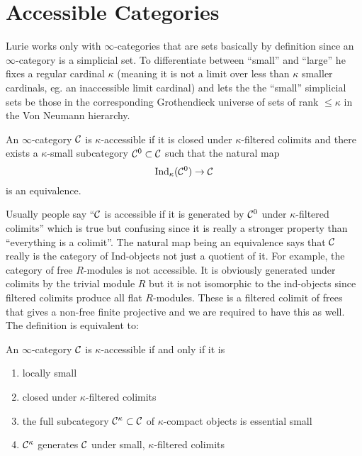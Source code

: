 \documentclass[12pt]{article}
\begin{document}
\section{Accessible Categories}

Lurie works only with $\infty$-categories that are sets basically by definition since an $\infty$-category is a simplicial set. To differentiate between ``small'' and ``large'' he fixes a regular cardinal $\kappa$ (meaning it is not a limit over less than $\kappa$ smaller cardinals, eg. an inaccessible limit cardinal) and lets the the ``small'' simplicial sets be those in the corresponding Grothendieck universe of sets of rank $\le \kappa$ in the Von Neumann hierarchy.

\begin{defn}
An $\infty$-category $\mathcal{C}$ is $\kappa$-accessible if it is closed under $\kappa$-filtered colimits and there exists a $\kappa$-small subcategory $\mathcal{C}^0 \subset \mathcal{C}$ such that the natural map
\[ \mathrm{Ind}_{\kappa}(\mathcal{C}^0) \to \mathcal{C} \]
is an equivalence.
\end{defn}

Usually people say ``$\mathcal{C}$ is accessible if it is generated by $\mathcal{C}^0$ under $\kappa$-filtered colimits'' which is true but confusing since it is really a stronger property than ``everything is a colimit''. The natural map being an equivalence says that $\mathcal{C}$ really is the category of Ind-objects not just a quotient of it. For example, the category of free $R$-modules is not accessible. It is obviously generated under colimits by the trivial module $R$ but it is not isomorphic to the ind-objects since filtered colimits produce all flat $R$-modules. These is a filtered colimit of frees that gives a non-free finite projective and we are required to have this as well. The definition is equivalent to:

\begin{lemma}
An $\infty$-category $\mathcal{C}$ is $\kappa$-accessible if and only if it is
\begin{enumerate}
\item locally small 
\item closed under $\kappa$-filtered colimits
\item the full subcategory $\mathcal{C}^\kappa \subset \mathcal{C}$ of $\kappa$-compact objects is essential small
\item $\mathcal{C}^\kappa$ generates $\mathcal{C}$ under small, 
$\kappa$-filtered colimits
\end{enumerate}
\end{lemma}
\end{document}
